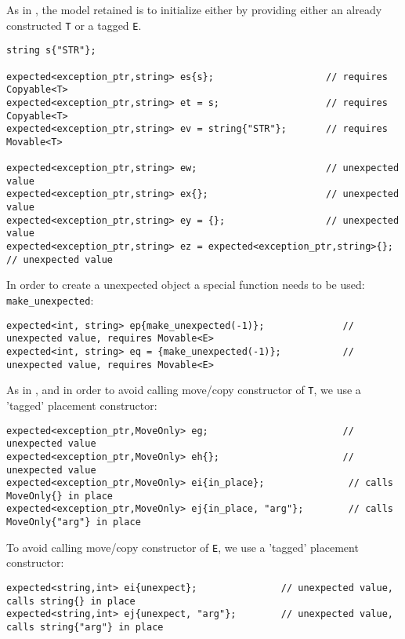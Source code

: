 \documentclass[a4paper,10pt]{article}
\newcommand{\cpp}[1]{\lstinline{#1}}
\begin{document}
As in \cite{OptionalRev4}, the model retained is to initialize either by providing either an already constructed \cpp{T} or a tagged \cpp{E}.

\begin{lstlisting}
string s{"STR"};

expected<exception_ptr,string> es{s};                    // requires Copyable<T>
expected<exception_ptr,string> et = s;                   // requires Copyable<T>
expected<exception_ptr,string> ev = string{"STR"};       // requires Movable<T>

expected<exception_ptr,string> ew;                       // unexpected value
expected<exception_ptr,string> ex{};                     // unexpected value
expected<exception_ptr,string> ey = {};                  // unexpected value
expected<exception_ptr,string> ez = expected<exception_ptr,string>{};  // unexpected value
\end{lstlisting}

In order to create a unexpected object a special function needs to be used: \cpp{make_unexpected}:

\begin{lstlisting}
expected<int, string> ep{make_unexpected(-1)};              // unexpected value, requires Movable<E>
expected<int, string> eq = {make_unexpected(-1)};           // unexpected value, requires Movable<E>
\end{lstlisting}

As in \cite{OptionalRev4}, and in order to avoid calling move/copy constructor of \cpp{T}, we use a 'tagged' placement constructor: 

\begin{lstlisting}
expected<exception_ptr,MoveOnly> eg;                        // unexpected value
expected<exception_ptr,MoveOnly> eh{};                      // unexpected value
expected<exception_ptr,MoveOnly> ei{in_place};               // calls MoveOnly{} in place
expected<exception_ptr,MoveOnly> ej{in_place, "arg"};        // calls MoveOnly{"arg"} in place
\end{lstlisting}

To avoid calling move/copy constructor of \cpp{E}, we use a 'tagged' placement constructor: 

\begin{lstlisting}
expected<string,int> ei{unexpect};               // unexpected value, calls string{} in place
expected<string,int> ej{unexpect, "arg"};        // unexpected value, calls string{"arg"} in place
\end{lstlisting}
\end{document}

